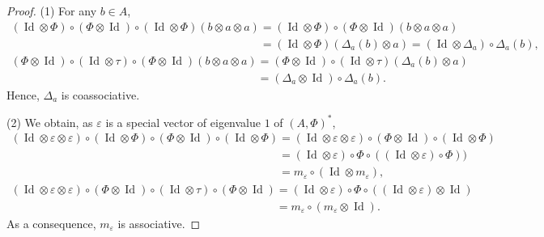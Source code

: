 \documentclass[10pt,a4paper]{amsart}
\numberwithin{equation}{section}
\begin{document}
\begin{proof}
(1) For any $b\in A$,
\begin{gather*}
(\operatorname{Id} \otimes \Phi)\circ (\Phi\otimes \operatorname{Id})\circ (\operatorname{Id} \otimes \Phi)(b\otimes a\otimes a)=(\operatorname{Id} \otimes \Phi)\circ (\Phi\otimes \operatorname{Id})(b\otimes a\otimes a)\\
\phantom{(\operatorname{Id} \otimes \Phi)\circ (\Phi\otimes \operatorname{Id})\circ (\operatorname{Id} \otimes \Phi)(b\otimes a\otimes a)}{}=(\operatorname{Id} \otimes \Phi)(\Delta_a(b)\otimes a)=(\operatorname{Id} \otimes \Delta_a)\circ \Delta_a(b),\\
(\Phi\otimes \operatorname{Id})\circ (\operatorname{Id} \otimes \tau)\circ (\Phi\otimes \operatorname{Id})(b\otimes a\otimes a)=(\Phi\otimes \operatorname{Id})\circ (\operatorname{Id} \otimes \tau)(\Delta_a(b)\otimes a)\\
\phantom{(\Phi\otimes \operatorname{Id})\circ (\operatorname{Id} \otimes \tau)\circ (\Phi\otimes \operatorname{Id})(b\otimes a\otimes a)}{}=(\Delta_a\otimes \operatorname{Id})\circ \Delta_a(b).
\end{gather*}
Hence, $\Delta_a$ is coassociative.

(2) We obtain, as $\varepsilon$ is a special vector of eigenvalue $1$ of $(A,\Phi)^*$,
\begin{gather*}
(\operatorname{Id} \otimes \varepsilon\otimes \varepsilon)\circ (\operatorname{Id} \otimes \Phi)\circ (\Phi\otimes \operatorname{Id})\circ (\operatorname{Id} \otimes \Phi)=(\operatorname{Id} \otimes \varepsilon\otimes \varepsilon)\circ (\Phi\otimes \operatorname{Id})\circ (\operatorname{Id} \otimes \Phi)\\
\phantom{(\operatorname{Id} \otimes \varepsilon\otimes \varepsilon)\circ (\operatorname{Id} \otimes \Phi)\circ (\Phi\otimes \operatorname{Id})\circ (\operatorname{Id} \otimes \Phi)}{}=(\operatorname{Id} \otimes \varepsilon)\circ \Phi\circ ((\operatorname{Id} \otimes \varepsilon)\circ \Phi))\\
\phantom{(\operatorname{Id} \otimes \varepsilon\otimes \varepsilon)\circ (\operatorname{Id} \otimes \Phi)\circ (\Phi\otimes \operatorname{Id})\circ (\operatorname{Id} \otimes \Phi)}{}=m_\varepsilon\circ(\operatorname{Id} \otimes m_\varepsilon),\\
(\operatorname{Id} \otimes \varepsilon\otimes \varepsilon)\circ (\Phi\otimes \operatorname{Id})\circ (\operatorname{Id} \otimes \tau)\circ (\Phi\otimes \operatorname{Id})=(\operatorname{Id} \otimes \varepsilon )\circ \Phi\circ ((\operatorname{Id} \otimes \varepsilon )\otimes \operatorname{Id})\\
\phantom{(\operatorname{Id} \otimes \varepsilon\otimes \varepsilon)\circ (\Phi\otimes \operatorname{Id})\circ (\operatorname{Id} \otimes \tau)\circ (\Phi\otimes \operatorname{Id})}{}=m_\varepsilon\circ(m_\varepsilon\otimes \operatorname{Id}).
\end{gather*}
As a consequence, $m_\varepsilon$ is associative.


\end{proof}
\end{document}
